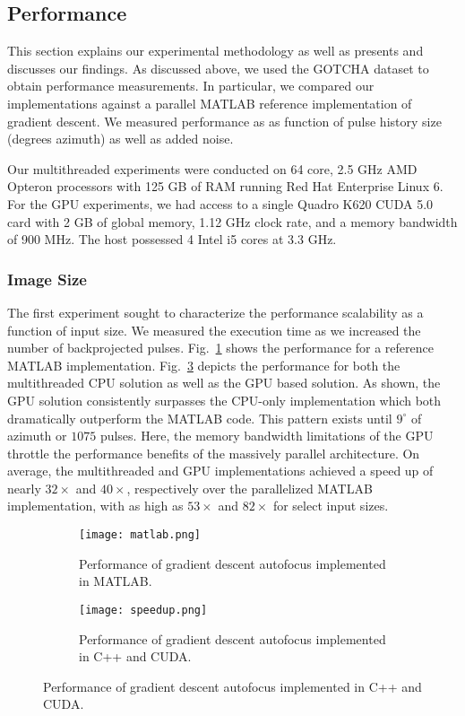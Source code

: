 \subsection{Performance}

This section explains our experimental methodology as well as presents and
discusses our findings. As discussed above, we used the GOTCHA dataset to
obtain performance measurements. In particular, we compared our implementations
against a parallel MATLAB reference implementation of gradient descent. We
measured performance as as function of pulse history size (degrees azimuth) as
well as added noise.

Our multithreaded experiments were conducted on 64 core, 2.5 GHz AMD Opteron
processors with 125 GB of RAM running Red Hat Enterprise Linux 6. For the GPU
experiments, we had access to a single Quadro K620 CUDA 5.0 card with 2 GB of
global memory, 1.12 GHz clock rate, and a memory bandwidth of 900 MHz. The host
possessed 4 Intel i5 cores at 3.3 GHz.

\subsubsection{Image Size}

The first experiment sought to characterize the performance scalability as a
function of input size. We measured the execution time as we increased the
number of backprojected pulses. Fig.~\ref{fig:matlab} shows the performance for
a reference MATLAB implementation. Fig.~\ref{fig:speedup} depicts the
performance for both the multithreaded CPU solution as well as the GPU based
solution. As shown, the GPU solution consistently surpasses the CPU-only
implementation which both dramatically outperform the MATLAB code. This pattern
exists until $9^{\circ}$ of azimuth or $1075$ pulses.  Here, the memory
bandwidth limitations of the GPU throttle the performance benefits of the
massively parallel architecture. On average, the multithreaded and GPU
implementations achieved a speed up of nearly $32\times$ and $40\times$,
respectively over the parallelized MATLAB implementation, with as high as
$53\times$ and $82\times$ for select input sizes.

\begin{figure}
  \centering
  \begin{subfigure}{0.5\textwidth}
    \centering
    \texttt{[image: matlab.png]}
    \caption{Performance of gradient descent autofocus implemented in MATLAB.}
    \label{fig:matlab}
  \end{subfigure}
  \vfill
  \begin{subfigure}{0.5\textwidth}
    \centering
    \texttt{[image: speedup.png]}
    \caption{Performance of gradient descent autofocus implemented in C++ and CUDA.}
    \label{fig:speedup}
  \end{subfigure}
\end{figure}


